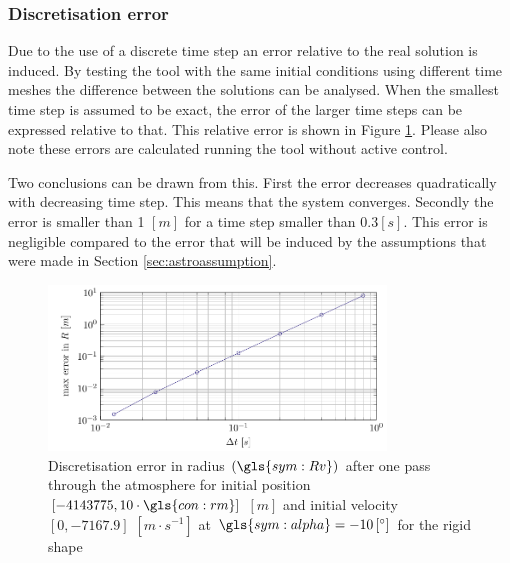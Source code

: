 \subsubsection{Discretisation error}
\label{sec:astrodisc}

Due to the use of a discrete time step an error relative to the real solution is induced. By testing the tool with the same initial conditions using different time meshes the difference between the solutions can be analysed. When the smallest time step is assumed to be exact, the error of the larger time steps can be expressed relative to that. This relative error is shown in Figure \ref{fig:atmos_disc}. Please also note these errors are calculated running the tool without active control.

Two conclusions can be drawn from this. First the error decreases quadratically with decreasing time step. This means that the system converges. Secondly the error is smaller than 1 $\left[m\right]$ for a time step smaller than $0.3 \left[s\right]$. This error is negligible compared to the error that will be induced by the assumptions that were made in Section \ref{sec:astroassumption}.



\begin{figure}[ht]
	\centering
	\includegraphics[width=0.8\textwidth]{Figure/orbit/dicretization.pdf}
	\caption[Discretisation error in location $\left(\gls{sym:Rv}\right)$ after one pass through the atmosphere for the rigid shape]{Discretisation error in radius $\left(\gls{sym:Rv}\right)$ after one pass through the atmosphere for initial position $\left[-4143775,10\cdot\gls{con:rm}\right]$ $\left[m\right]$ and initial velocity $\left[0,-7167.9\right]$ $\left[m\cdot s^{-1} \right]$ at $\gls{sym:alpha}=-10\left[^\circ\right]$ for the rigid shape}
	\label{fig:atmos_disc}
\end{figure}

